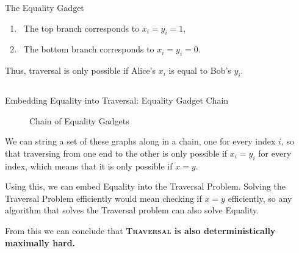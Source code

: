 \begin{columns}[T]
\begin{block}{ The Equality Gadget}
\begin{enumerate}
    \item \ The top branch corresponds to $x_i = y_i = 1$, 
    \item \ The bottom branch corresponds to $x_i = y_i = 0$. 
\end{enumerate}

Thus, traversal is only possible if Alice's $x_i$ is equal to Bob's
$y_i$.

\end{block}

\end{columns}

\begin{block}{Embedding Equality into Traversal: Equality Gadget Chain}
\vspace{0.3em}

\begin{figure}[H]
\centering
{}
\caption{Chain of Equality Gadgets}
\end{figure}

We can string a set of these graphs along in a chain, one for every index $i$,
so that traversing from one end to the other is only possible if $x_i = y_i$
for every index, which means that it is only possible if $x=y$.

Using this, we can embed Equality into the Traversal Problem. Solving the Traversal Problem 
efficiently would mean checking if $x=y$ efficiently, so any algorithm that
solves the Traversal problem can also solve Equality.

From this we can conclude that \textbf{\textsc{Traversal} is also
deterministically maximally hard.}

\end{block}
